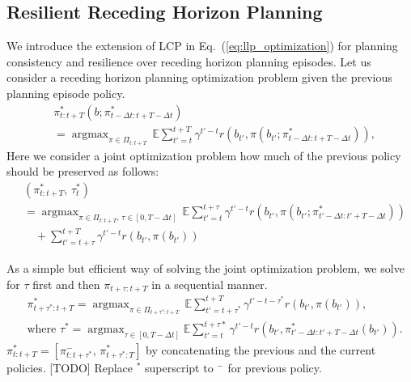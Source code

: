 \documentclass[letterpaper]{article} %
\newcommand{\argmax}{\mathop{\mathrm{argmax}}}
\begin{document}
\subsection{Resilient Receding Horizon Planning} \label{ssec:resilient_rhp}
We introduce the extension of LCP in Eq.~(\ref{eq:llp_optimization}) for planning consistency and resilience over receding horizon planning episodes.
Let us consider a receding horizon planning optimization problem given the previous planning episode policy.
\begin{align}
  &\pi_{t:t+T}^*(b; \pi_{t-\Delta t:t+T-\Delta t}^*) 
  \nonumber \\
  &= \argmax_{\pi \in \Pi_{t:t+T}} \, \mathbb{E} \sum_{t'=t}^{t+T} \gamma^{t'-t} r(b_{t'}, \pi(b_{t'}; \pi_{t-\Delta t:t+T-\Delta t}^*)),
  \label{eq:revised_receding_objective_function}
\end{align}
%
Here we consider a joint optimization problem how much of the previous policy should be preserved as follows:
\begin{align}
  &(\pi_{t:t+T}^*, \, \tau_t^*)
  \nonumber \\
  & = \argmax_{\pi \in \Pi_{t:t+T}, \, \tau \in [0, T-\Delta t]} \, \mathbb{E} \sum_{t'=t}^{t+\tau} \gamma^{t'-t} r(b_{t'}, \pi(b_{t'}; \pi_{{t'}-\Delta t:{t'}+T-\Delta t}^*))
  \nonumber \\
  &\quad + \sum_{t'=t+\tau}^{t+T} \gamma^{t'-t} r(b_{t'}, \pi(b_{t'}))
\end{align}


As a simple but efficient way of solving the joint optimization problem, we solve for $\tau$ first and then $\pi_{t+\tau:t+T}$ in a sequential manner.
\begin{align}
  & \pi_{t+\tau^*:t+T}^* = \argmax_{\pi \in \Pi_{t+\tau^*:t+T}} \, \mathbb{E} \sum_{t'=t+\tau^*}^{t+T} \gamma^{t'-t-\tau^*} r(b_{t'}, \pi(b_{t'})),
  \nonumber \\
  &\text{where } \tau^* = \argmax_{\tau \in [0, T-\Delta t]} \mathbb{E} \sum_{t'=t}^{t+\tau*} \gamma^{t'-t} r(b_{t'}, \pi_{{t'}-\Delta t:{t'}+T-\Delta t}^*(b_{t'})).
  \label{eq:resilient_rhp}
\end{align}
$\pi_{t:t+T}^* = [\pi_{t:t+\tau^*}^-, \, \pi_{t+\tau^*:T}^*]$ by concatenating the previous and the current policies.
[TODO] Replace $^*$ superscript to $^-$ for previous policy.
\end{document}
